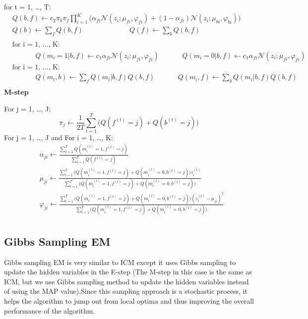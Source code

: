 \documentclass{article} %
\begin{document}
for t = 1, \ldots , T: 
\begin{align*} 
&Q(b,f) \leftarrow c_2\pi_b\pi_f\prod_{i=1}^K\Bigg(\alpha_{fi}\mathcal{N}(z_i;\mu_{fi},\varphi_{fi})+ (1-\alpha_{fi})\mathcal{N}(z_i;\mu_{bi},\varphi_{bi}) \Bigg) \\
&Q(b) \leftarrow \sum_{f} Q(b,f) \text{ }\text{ }\text{ }\text{ }\text{ }\text{ }\text{ }\text{ }\text{ }\text{ }Q(f) \leftarrow \sum_{b} Q(b,f) \\\\
&\text{for i = 1, \ldots , K: } \\
&\text{ }\text{ }\text{ }\text{ }\text{ }Q(m_i = 1|b,f) \leftarrow c_1\alpha_{fi}\mathcal{N}(z_i;\mu_{fi},\varphi_{fi})\text{ }\text{ }\text{ }\text{ }\text{ }Q(m_i = 0|b,f) \leftarrow c_1\alpha_{fi}\mathcal{N}(z_i;\mu_{fi},\varphi_{fi})\\
&\text{for i = 1, \ldots , K: } \\
&\text{ }\text{ }\text{ }\text{ }\text{ }Q(m_i,b) \leftarrow \sum_{f}Q(m_i|b,f) Q(b,f)\text{ }\text{ }\text{ }\text{ }\text{ }Q(m_i,f) \leftarrow \sum_{b}Q(m_i|b,f) Q(b,f)\\
\end{align*} 
\textbf{M-step}

For j = 1, \ldots , J: 
\begin{equation*}
\pi_j \leftarrow \frac{1}{2T}\sum_{t=1}^T\Bigg(Q(f^{(t)} = j) + Q(b^{(t)} = j)\Bigg)
\end{equation*}
For j = 1, \ldots , J and For i = 1, \ldots , K: 
\begin{align*} 
&\alpha_{ji} \leftarrow \frac{\sum_{t=1}^T Q(m_i^{(t)}=1,f^{(t)} = j)}{\sum_{t=1}^TQ(f^{(t)} = j)} \\
&\mu_{ji} \leftarrow \frac{\sum_{t=1}^T\Big(Q(m_i^{(t)}=1,f^{(t)} = j) + Q(m_i^{(t)}=0,b^{(t)} = j)\Big)z_i^{(t)}}{\sum_{t=1}^T \Big(Q(m_i^{(t)}=1,f^{(t)} = j) + Q(m_i^{(t)}=0,b^{(t)} = j)\Big)} \\
&\varphi_{ji} \leftarrow \frac{\sum_{t=1}^T\Big(Q(m_i^{(t)}=1,f^{(t)} = j) + Q(m_i^{(t)}=0,b^{(t)} = j)\Big)(z_i^{(t)}-\mu_{ji})^2}{\sum_{t=1}^T \Big(Q(m_i^{(t)}=1,f^{(t)} = j) + Q(m_i^{(t)}=0,b^{(t)} = j)\Big)} \\
\end{align*} 
\subsection{Gibbs Sampling EM}
\label{gibbs_em}
Gibbs sampling EM is very similar to ICM except it uses Gibbs sampling to update the hidden variables in the E-step (The M-step in this case is the same as ICM, but we use Gibbs sampling method to update the hidden variables instead of using the MAP value).Since this sampling approach is a stochastic process, it helps the algorithm to jump out from local optima and thus improving the overall performance of the algorithm.
\end{document}
